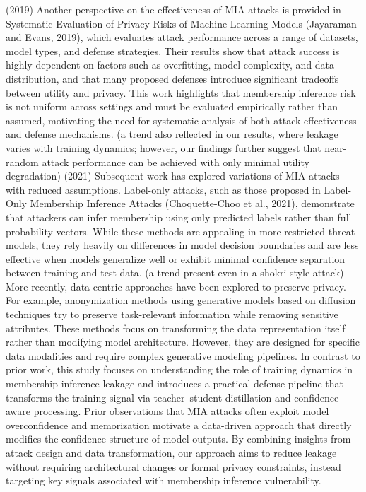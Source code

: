 \documentclass[conference]{IEEEtran}
\begin{document}
(2019)
Another perspective on the effectiveness of MIA attacks is provided in Systematic Evaluation of Privacy Risks of Machine Learning Models (Jayaraman and Evans, 2019), which evaluates attack performance across a range of datasets, model types, and defense strategies. Their results show that attack success is highly dependent on factors such as overfitting, model complexity, and data distribution, and that many proposed defenses introduce significant tradeoffs between utility and privacy. This work highlights that membership inference risk is not uniform across settings and must be evaluated empirically rather than assumed, motivating the need for systematic analysis of both attack effectiveness and defense mechanisms. (a trend also reflected in our results, where leakage varies with training dynamics; however, our findings further suggest that near-random attack performance can be achieved with only minimal utility degradation)
(2021)
Subsequent work has explored variations of MIA attacks with reduced assumptions. Label-only attacks, such as those proposed in Label-Only Membership Inference Attacks (Choquette-Choo et al., 2021), demonstrate that attackers can infer membership using only predicted labels rather than full probability vectors. While these methods are appealing in more restricted threat models, they rely heavily on differences in model decision boundaries and are less effective when models generalize well or exhibit minimal confidence separation between training and test data. (a trend present even in a shokri-style attack)
More recently, data-centric approaches have been explored to preserve privacy. For example, anonymization methods using generative models based on diffusion techniques try to preserve task-relevant information while removing sensitive attributes. These methods focus on transforming the data representation itself rather than modifying model architecture. However, they are designed for specific data modalities and require complex generative modeling pipelines.
In contrast to prior work, this study focuses on understanding the role of training dynamics in membership inference leakage and introduces a practical defense pipeline that transforms the training signal via teacher--student distillation and confidence-aware processing. Prior observations that MIA attacks often exploit model overconfidence and memorization motivate a data-driven approach that directly modifies the confidence structure of model outputs. By combining insights from attack design and data transformation, our approach aims to reduce leakage without requiring architectural changes or formal privacy constraints, instead targeting key signals associated with membership inference vulnerability.
\end{document}
